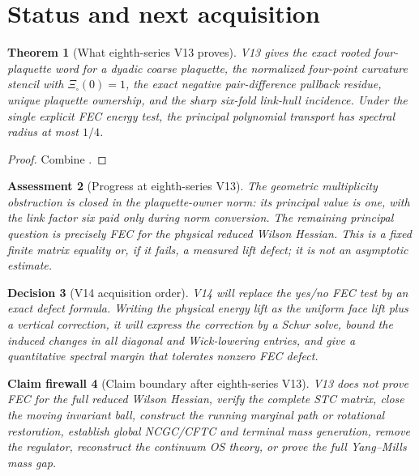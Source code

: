 \documentclass[11pt,oneside]{book}
\newtheorem{theorem}{Theorem}[chapter]
\newtheorem{assessment}[theorem]{Assessment}
\newtheorem{firewall}[theorem]{Claim firewall}
\newtheorem{decision}[theorem]{Decision}
\theoremstyle{definition}
\theoremstyle{remark}
\begin{document}
\section{Status and next acquisition}
\label{sec:e8v13-status}

\begin{theorem}[What eighth-series V13 proves]
\label{thm:e8v13-result}
V13 gives the exact rooted four-plaquette word for a dyadic coarse
plaquette, the normalized four-point curvature stencil with
\(\Xi_\square(0)=1\), the exact negative pair-difference pullback
residue, unique plaquette ownership, and the sharp six-fold link-hull
incidence.  Under the single explicit FEC energy test, the principal
polynomial transport has spectral radius at most \(1/4\).
\end{theorem}

\begin{proof}
Combine
.
\end{proof}

\begin{assessment}[Progress at eighth-series V13]
\label{ass:e8v13-status}
The geometric multiplicity obstruction is closed in the
plaquette-owner norm: its principal value is one, with the link factor
six paid only during norm conversion.  The remaining principal
question is precisely FEC for the physical reduced Wilson Hessian.
This is a fixed finite matrix equality or, if it fails, a measured
lift defect; it is not an asymptotic estimate.
\end{assessment}

\begin{decision}[V14 acquisition order]
\label{dec:e8v13-V14}
V14 will replace the yes/no FEC test by an exact defect formula.
Writing the physical energy lift as the uniform face lift plus a
vertical correction, it will express the correction by a Schur solve,
bound the induced changes in all diagonal and Wick-lowering entries,
and give a quantitative spectral margin that tolerates nonzero FEC
defect.
\end{decision}

\begin{firewall}[Claim boundary after eighth-series V13]
\label{fire:e8v13-claim}
V13 does not prove FEC for the full reduced Wilson Hessian, verify the
complete STC matrix, close the moving invariant ball, construct the
running marginal path or rotational restoration, establish global
NCGC/CFTC and terminal mass generation, remove the regulator,
reconstruct the continuum OS theory, or prove the full Yang--Mills
mass gap.
\end{firewall}
\end{document}

